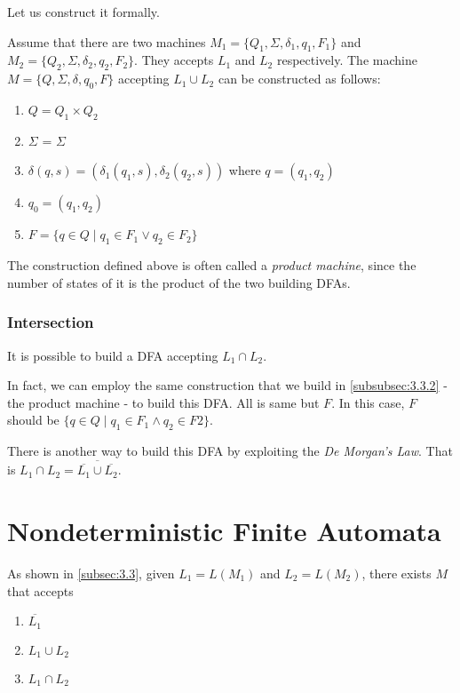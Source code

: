 \documentclass[11pt]{article}
\begin{document}
Let us construct it formally.
\begin{definition}
Assume that there are two machines $M_1=\{Q_1,\Sigma,\delta_1,q_1,F_1\}$ and
$M_2 = \{Q_2, \Sigma,\delta_2,q_2,F_2\}$. They accepts $L_1$ and $L_2$ respectively.
The machine $M = \{Q,\Sigma,\delta,q_0,F\}$ accepting $L_1 \cup L_2$ can be
constructed as follows:
\begin{enumerate}
\item $Q = Q_1 \times Q_2$
\item $\Sigma$ = $\Sigma$
\item $\delta(q, s) = (\delta_1(q_1, s), \delta_2(q_2, s))$ where $q = (q_1, q_2)$
\item $q_0 = (q_1, q_2)$
\item $F = \{q \in Q \mid q_1 \in F_1 \vee q_2 \in F_2\}$
\end{enumerate}
\end{definition}

The construction defined above is often called a \emph{product machine}, since the
number of states of it is the product of the two building DFAs.

\subsubsection{Intersection}

It is possible to build a DFA accepting $L_1 \cap L_2$.

In fact, we can employ the same construction that we build in \ref{subsubsec:3.3.2}
- the product machine - to build this DFA. All is same but $F$. In this case, $F$
should be $\{q \in Q \mid q_1 \in F_1 \wedge q_2 \in F2\}$.

There is another way to build this DFA by exploiting the \emph{De Morgan's Law}.
That is $L_1 \cap L_2 = \overline{\overline{L_1} \cup \overline{L_2}}$.

\section{Nondeterministic Finite Automata} \label{sec:4}

As shown in \ref{subsec:3.3}, given $L_1 = L(M_1)$ and $L_2 = L(M_2)$, there exists
$M$ that accepts
\begin{enumerate}
\item $\overline{L_1}$
\item $L_1 \cup L_2$
\item $L_1 \cap L_2$
\end{enumerate}
\end{document}
